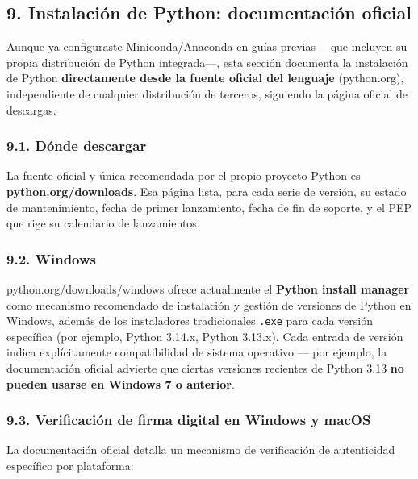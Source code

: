 \documentclass[
  doc,
  floatsintext,
  longtable,
  a4paper,
  nolmodern,
  notxfonts,
  notimes,
  12pt,
  colorlinks=true,linkcolor=blue,citecolor=blue,urlcolor=blue]{apa7}
\begin{document}
\subsection{9. Instalación de Python: documentación
oficial}\label{instalaciuxf3n-de-python-documentaciuxf3n-oficial}

Aunque ya configuraste Miniconda/Anaconda en guías previas ---que
incluyen su propia distribución de Python integrada---, esta sección
documenta la instalación de Python \textbf{directamente desde la fuente
oficial del lenguaje} (python.org), independiente de cualquier
distribución de terceros, siguiendo la página oficial de descargas.

\subsubsection{9.1. Dónde descargar}\label{duxf3nde-descargar}

La fuente oficial y única recomendada por el propio proyecto Python es
\textbf{python.org/downloads}. Esa página lista, para cada serie de
versión, su estado de mantenimiento, fecha de primer lanzamiento, fecha
de fin de soporte, y el PEP que rige su calendario de lanzamientos.

\subsubsection{9.2. Windows}\label{windows}

python.org/downloads/windows ofrece actualmente el \textbf{Python
install manager} como mecanismo recomendado de instalación y gestión de
versiones de Python en Windows, además de los instaladores tradicionales
\texttt{.exe} para cada versión específica (por ejemplo, Python 3.14.x,
Python 3.13.x). Cada entrada de versión indica explícitamente
compatibilidad de sistema operativo --- por ejemplo, la documentación
oficial advierte que ciertas versiones recientes de Python 3.13
\textbf{no pueden usarse en Windows 7 o anterior}.

\subsubsection{9.3. Verificación de firma digital en Windows y
macOS}\label{verificaciuxf3n-de-firma-digital-en-windows-y-macos}

La documentación oficial detalla un mecanismo de verificación de
autenticidad específico por plataforma:
\end{document}
